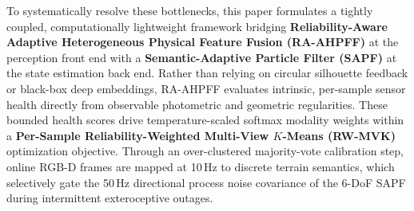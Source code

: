 \documentclass[11pt, a4paper]{article}
\begin{document}
To systematically resolve these bottlenecks, this paper formulates a tightly coupled, computationally lightweight framework bridging \textbf{Reliability-Aware Adaptive Heterogeneous Physical Feature Fusion (RA-AHPFF)} at the perception front end with a \textbf{Semantic-Adaptive Particle Filter (SAPF)} at the state estimation back end. Rather than relying on circular silhouette feedback or black-box deep embeddings, RA-AHPFF evaluates intrinsic, per-sample sensor health directly from observable photometric and geometric regularities. These bounded health scores drive temperature-scaled softmax modality weights within a \textbf{Per-Sample Reliability-Weighted Multi-View $K$-Means (RW-MVK)} optimization objective. Through an over-clustered majority-vote calibration step, online RGB-D frames are mapped at 10\,Hz to discrete terrain semantics, which selectively gate the 50\,Hz directional process noise covariance of the 6-DoF SAPF during intermittent exteroceptive outages.
\end{document}

